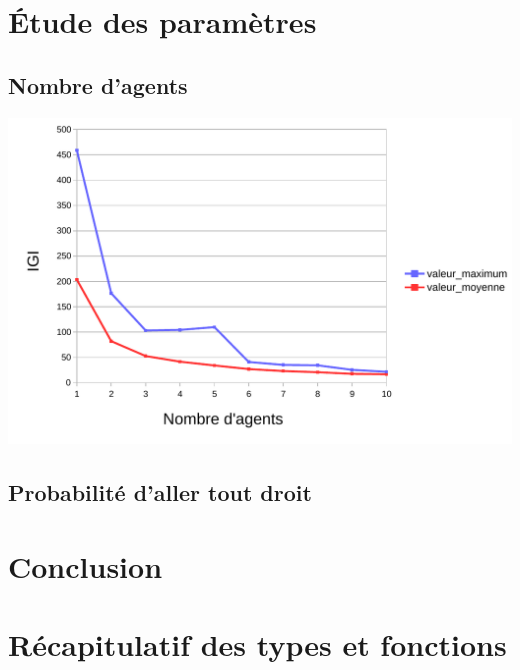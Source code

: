 \documentclass{article}
\begin{document}
\section{Étude des paramètres}
    \subsection{Nombre d'agents}
    \begin{center}
        \includegraphics[width = \textwidth]{graphes pdf/variance tortues IGI spirale.pdf}
    \end{center}
    \subsection{Probabilité d'aller tout droit}
\section{Conclusion}
    \subsection{}

\appendix
\newpage
\section{Récapitulatif des types et fonctions}
\end{document}
